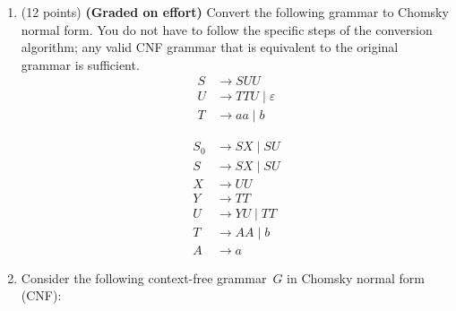 \documentclass{article}
\theoremstyle{definition}
\newenvironment {solution}
{
\begin{tcolorbox}
}
{
\end{tcolorbox}
}
\begin{document}
\begin{enumerate}
\begin{solution}
\begin{center}
        \end{center}
    \end{solution}
    
    \item (12 points) \textbf{(Graded on effort)} Convert the following grammar to Chomsky normal form. You do not have to follow the specific steps of the conversion algorithm; any valid CNF grammar that is equivalent to the original grammar is sufficient.
    \begin{align*}
        S &\rightarrow SUU\\
        U &\rightarrow TTU \mid \varepsilon \\
        T &\rightarrow aa \mid b
    \end{align*}
    \begin{solution}
        \begin{align*}
            S_0 &\rightarrow SX \mid SU \\
            S &\rightarrow SX \mid SU \\
            X &\rightarrow UU \\
            Y &\rightarrow TT \\
            U &\rightarrow YU \mid TT \\
            T &\rightarrow AA \mid b \\
            A &\rightarrow a
        \end{align*}
    \end{solution}
    \item Consider the following context-free grammar~$G$ in Chomsky normal form (CNF):


\end{enumerate}
\end{document}
